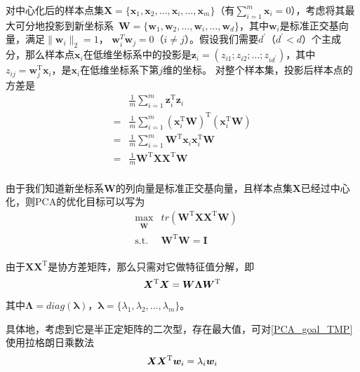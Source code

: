 \documentclass[a4paper,AutoFakeBold,oneside,12pt]{book}
\begin{document}
对中心化后的样本点集$\bm{X}=\{\bm{x}_1,\bm{x}_2,\ldots,\bm{x}_i,\ldots,\bm{x}_m\}$（有$\sum_{i=1}^{m}\bm{x}_i = 0$），考虑将其最大可分地投影到新坐标系\ $\bm{W}= \{\bm{w}_1,\bm{w}_2,\ldots,\bm{w}_i,\ldots,\bm{w}_d\} $，其中$\bm{w}_i$是标准正交基向量，满足$\|\bm{w}_i\|_2 = 1$， $\bm{w}_i^T\bm{w}_j = 0$（$i \not= j$）。假设我们需要$d^\prime$（$d^\prime < d$）个主成分，那么样本点$\bm{x}_i$在低维坐标系中的投影是$\bm{z}_i = (z_{i1};z_{i2};\ldots;z_{id^\prime})$，其中$z_{ij} = \bm{w}_j^\mathrm{T}\bm{x}_i$，是$\bm{x}_i$在低维坐标系下第$j$维的坐标。
对整个样本集，投影后样本点的方差是
\begin{equation}
\begin{aligned}
    & \frac{1}{m}\sum_{i=1}^m \bm{z}_i^\mathrm{T}\bm{z}_i \\
= & \frac{1}{m}\sum_{i=1}^m (\bm{x}_i^\mathrm{T}\bm{W})^\mathrm{T}(\bm{x}_i^\mathrm{T}\bm{W}) \\
= & \frac{1}{m}\sum_{i=1}^m \bm{W}^\mathrm{T}\bm{x}_i\bm{x}_i^\mathrm{T}\bm{W} \\
= & \frac{1}{m} \bm{W}^\mathrm{T}\bm{X}\bm{X}^\mathrm{T}\bm{W} \\
\end{aligned}
\end{equation}

由于我们知道新坐标系$\bm{W}$的列向量是标准正交基向量，且样本点集$\bm{X}$已经过中心化，则PCA的优化目标可以写为
\begin{equation}
\label{PCA_goal_TMP}
\begin{aligned}
& \max_{\substack{\bm{W}}}  &  tr(\bm{W}^\mathrm{T}\bm{X}\bm{X}^ \mathrm{T}\bm{W}) \\
& \operatorname{ s.t. }  &  \bm{W}^\mathrm{T}\bm{W} = \bm{I} \\
\end{aligned}
\end{equation}

由于$\bm{X}\bm{X}^ \mathrm{ T }$是协方差矩阵，那么只需对它做特征值分解，即
\begin{equation}
\label{PCA_eigenvalue}
\bm{X}^ \mathrm{ T }\bm{X} = \bm{W}\bm{\Lambda}\bm{W}^ \mathrm{ T } \\
\end{equation}
其中$\bm{\Lambda}=diag(\bm{\lambda})$，$\bm{\lambda} = \{\lambda_1,\lambda_2,\ldots,\lambda_m\}$。

具体地，考虑到它是半正定矩阵的二次型，存在最大值，可对\eqref{PCA_goal_TMP}使用拉格朗日乘数法
\begin{equation}
\bm{X}\bm{X}^ \mathrm{ T }\bm{w}_i  = \lambda_i \bm{w}_i \\
\end{equation}
\end{document}
